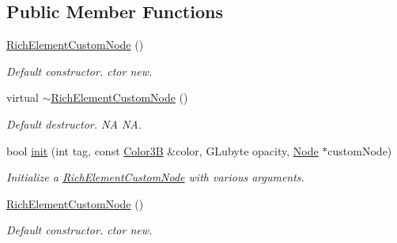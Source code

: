 \subsection*{Public Member Functions}
\begin{DoxyCompactItemize}
\item 
\mbox{\label{classui_1_1RichElementCustomNode_a911f4ace110b31440a90688397e1d241}} 
\hyperlink{classui_1_1RichElementCustomNode_a911f4ace110b31440a90688397e1d241}{Rich\+Element\+Custom\+Node} ()
\begin{DoxyCompactList}\small\item\em Default constructor.  ctor  new. \end{DoxyCompactList}\item 
\mbox{\label{classui_1_1RichElementCustomNode_a0200bb09dcff76ec26ce4fdfadc14f32}} 
virtual \hyperlink{classui_1_1RichElementCustomNode_a0200bb09dcff76ec26ce4fdfadc14f32}{$\sim$\+Rich\+Element\+Custom\+Node} ()
\begin{DoxyCompactList}\small\item\em Default destructor.  NA  NA. \end{DoxyCompactList}\item 
bool \hyperlink{classui_1_1RichElementCustomNode_a6dba66cc3d97ab82c9f17c35f800a4d6}{init} (int tag, const \hyperlink{structColor3B}{Color3B} \&color, G\+Lubyte opacity, \hyperlink{classNode}{Node} $\ast$custom\+Node)
\begin{DoxyCompactList}\small\item\em Initialize a \hyperlink{classui_1_1RichElementCustomNode}{Rich\+Element\+Custom\+Node} with various arguments. \end{DoxyCompactList}\item 
\mbox{\label{classui_1_1RichElementCustomNode_a911f4ace110b31440a90688397e1d241}} 
\hyperlink{classui_1_1RichElementCustomNode_a911f4ace110b31440a90688397e1d241}{Rich\+Element\+Custom\+Node} ()
\begin{DoxyCompactList}\small\item\em Default constructor.  ctor  new. \end{DoxyCompactList}\item 
\mbox{\label{classui_1_1RichElementCustomNode_a0200bb09dcff76ec26ce4fdfadc14f32}} 

\end{DoxyCompactItemize}
